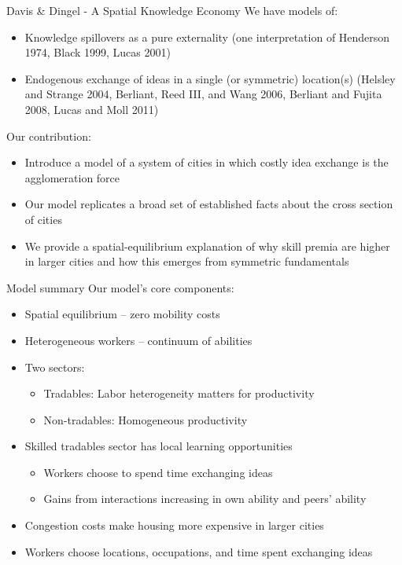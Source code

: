 \documentclass[11pt,notes=hide,aspectratio=169]{beamer}
\begin{document}
\begin{frame}{ Davis \& Dingel - A Spatial Knowledge Economy}
We have models of: 
\begin{itemize}
	\item Knowledge spillovers as a pure externality (one interpretation of Henderson 1974, Black 1999, Lucas 2001)
	\item Endogenous exchange of ideas in a single (or symmetric) location(s) (Helsley and Strange 2004, Berliant, Reed III, and Wang 2006, Berliant and Fujita 2008, Lucas and Moll 2011)
\end{itemize}
Our contribution:
\begin{itemize}
	\item Introduce a model of a system of cities in which costly idea exchange is the agglomeration force 
	\item Our model replicates a broad set of established facts about the cross section of cities
	\item We provide a spatial-equilibrium explanation of why skill premia are higher in larger cities and how this emerges from symmetric fundamentals
\end{itemize}
\end{frame}
\begin{frame}{Model summary}
Our model's core components: 
\begin{itemize}
\item Spatial equilibrium -- zero mobility costs 
\item Heterogeneous workers -- continuum of abilities 
\item Two sectors: 
\begin{itemize}
	\item Tradables: Labor heterogeneity matters for productivity
	\item Non-tradables: Homogeneous productivity
\end{itemize}
\item Skilled tradables sector has local learning opportunities 
\begin{itemize}
	\item Workers choose to spend time exchanging ideas 
	\item Gains from interactions increasing in own ability and peers' ability
\end{itemize}
\item Congestion costs make housing more expensive in larger cities 
\item Workers choose locations, occupations, and time spent exchanging ideas 
\end{itemize}
\end{frame}
\end{document}
